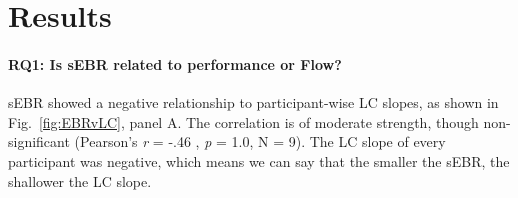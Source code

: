 \documentclass[10pt,letterpaper,floatsintext]{article}
\begin{document}

\section{Results}


\paragraph{RQ1: Is sEBR related to performance or Flow?}

sEBR showed a negative relationship to participant-wise LC slopes, as shown in Fig.~\ref{fig:EBRvLC}, panel A. The correlation is of moderate strength, though non-significant (Pearson's {\it r} = -.46 , {\it p} = 1.0, N = 9). %
The LC slope of every participant was negative, which means we can say that the smaller the sEBR, the shallower the LC slope.%
\end{document}
